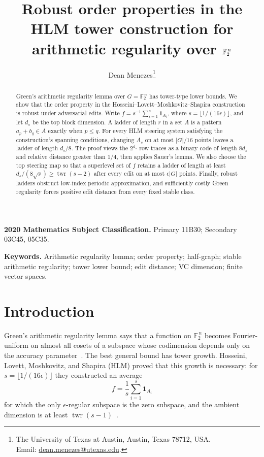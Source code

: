 \documentclass[11pt]{article}
\title{Robust order properties in the HLM tower construction for arithmetic regularity over \texorpdfstring{$\F_2^{\,n}$}{F2^n}}
\author{Dean Menezes\thanks{The University of Texas at Austin, Austin, Texas 78712, USA.\\
Email: \href{mailto:dean.menezes@utexas.edu}{dean.menezes@utexas.edu}.}}
\date{}
\theoremstyle{plain}
\theoremstyle{definition}
\numberwithin{theorem}{section}
\newcommand{\F}{\mathbb{F}}
\newcommand{\abs}[1]{\lvert #1\rvert}
\newcommand{\twr}{\operatorname{twr}}
\begin{document}
\maketitle

\begin{abstract}
Green's arithmetic regularity lemma over $G=\F_2^{\,n}$ has tower-type
lower bounds.  We show that the order property in the
Hosseini--Lovett--Moshkovitz--Shapira construction is robust under
adversarial edits.  Write
$f=s^{-1}\sum_{i=1}^{s}\mathbf 1_{A_i}$, where
$s=\lfloor1/(16\epsilon)\rfloor$, and let $d_s$ be the top block
dimension.  A ladder of length $r$ in a set $A$ is a pattern
$a_p+b_q\in A$ exactly when $p\le q$.  For every HLM steering system
satisfying the construction's spanning conditions, changing $A_s$ on at
most $\abs G/16$ points leaves a ladder of length $d_s/8$.  The proof
views the $2^{d_s}$ row traces as a binary code of length $8d_s$ and
relative distance greater than $1/4$, then applies Sauer's lemma.  We also
choose the top steering map so that a superlevel set of $f$ retains a
ladder of length at least $d_s/(8\sqrt{s})\ge\twr(s-2)$ after every edit on
at most $\epsilon\abs G$ points.  Finally, robust ladders obstruct
low-index periodic approximation, and sufficiently costly Green
regularity forces positive edit distance from every fixed stable class.
\end{abstract}

\medskip
\noindent\textbf{2020 Mathematics Subject Classification.}
Primary 11B30; Secondary 03C45, 05C35.

\noindent\textbf{Keywords.}
Arithmetic regularity lemma; order property; half-graph; stable arithmetic
regularity; tower lower bound; edit distance; VC dimension; finite vector spaces.

\section{Introduction}\label{sec:intro}

Green's arithmetic regularity lemma says that a function on
$\F_2^{\,n}$ becomes Fourier-uniform on almost all cosets of a subspace
whose codimension depends only on the accuracy parameter~\cite{G}.  The
best general bound has tower growth.  Hosseini, Lovett, Moshkovitz, and
Shapira (HLM) proved that this growth is necessary: for
$s=\lfloor1/(16\epsilon)\rfloor$ they constructed an average
\[
  f=\frac1s\sum_{i=1}^{s}\mathbf 1_{A_i}
\]
for which the only $\epsilon$-regular subspace is the zero subspace, and
the ambient dimension is at least $\twr(s-1)$~\cite{HLM}.
\end{document}
